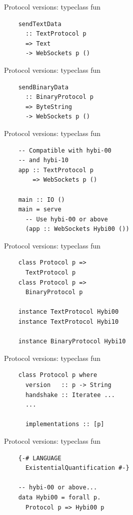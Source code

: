 \documentclass[20pt]{beamer}
\begin{document}
\begin{frame}[fragile]{Protocol versions: typeclass fun}
    \begin{lstlisting}
    sendTextData
      :: TextProtocol p
      => Text
      -> WebSockets p ()
    \end{lstlisting}
\end{frame}

\begin{frame}[fragile]{Protocol versions: typeclass fun}
    \begin{lstlisting}
    sendBinaryData
      :: BinaryProtocol p
      => ByteString
      -> WebSockets p ()
    \end{lstlisting}
\end{frame}

\begin{frame}[fragile]{Protocol versions: typeclass fun}
    \begin{lstlisting}
    -- Compatible with hybi-00
    -- and hybi-10
    app :: TextProtocol p
        => WebSockets p ()

    main :: IO ()
    main = serve
      -- Use hybi-00 or above
      (app :: WebSockets Hybi00 ())
    \end{lstlisting}
\end{frame}

\begin{frame}[fragile]{Protocol versions: typeclass fun}
    \begin{lstlisting}
    class Protocol p =>
      TextProtocol p
    class Protocol p =>
      BinaryProtocol p

    instance TextProtocol Hybi00
    instance TextProtocol Hybi10

    instance BinaryProtocol Hybi10
    \end{lstlisting}
\end{frame}

\begin{frame}[fragile]{Protocol versions: typeclass fun}
    \begin{lstlisting}
    class Protocol p where
      version   :: p -> String
      handshake :: Iteratee ...
      ...

      implementations :: [p]
    \end{lstlisting}
\end{frame}

\begin{frame}[fragile]{Protocol versions: typeclass fun}
    \begin{lstlisting}
    {-# LANGUAGE
      ExistentialQuantification #-}

    -- hybi-00 or above...
    data Hybi00 = forall p.
      Protocol p => Hybi00 p
    \end{lstlisting}
\end{frame}
\end{document}
